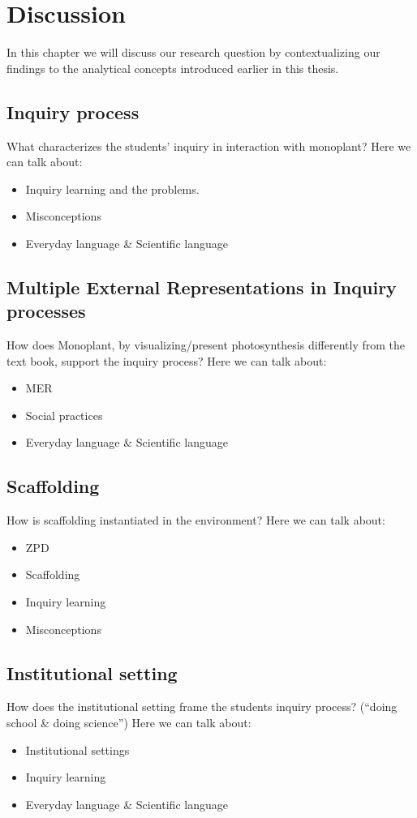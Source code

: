 \chapter{Discussion}
In this chapter we will discuss our research question by contextualizing our findings to the analytical concepts introduced earlier in this thesis. 

\section{Inquiry process}
What characterizes the students’ inquiry in interaction with monoplant?
Here we can talk about: 
\begin{itemize}
\item{Inquiry learning and the problems. \citep{de1998scientific}}
\item{Misconceptions}
\item{Everyday language \& Scientific language}
\end{itemize}

\section{Multiple External Representations in Inquiry processes}
How does Monoplant, by visualizing/present photosynthesis differently from the text book, support the inquiry process? 
Here we can talk about: 
\begin{itemize}
\item{MER}
\item{Social practices}
\item{Everyday language \& Scientific language}
\end{itemize}

\section{Scaffolding}
How is scaffolding instantiated in the environment?
Here we can talk about: 
\begin{itemize}
\item{ZPD}
\item{Scaffolding}
\item{Inquiry learning}
\item{Misconceptions}

\end{itemize}

\section{Institutional setting}
How does the institutional setting frame the students inquiry process? (“doing school & doing science”)
Here we can talk about: 
\begin{itemize}
\item{Institutional settings}
\item{Inquiry learning}
\item{Everyday language \& Scientific language}
\end{itemize}
